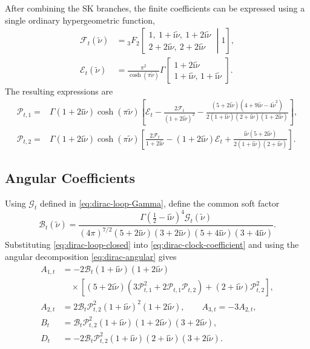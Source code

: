 \documentclass[a4paper,12pt]{article}
\def\ii{\mathrm{i}}
\def\tn{\tilde\nu}
\begin{document}
After combining the SK branches, the finite coefficients can be expressed using a single ordinary hypergeometric function,
\begin{align}
 \mathcal F_t(\tn)&={}_3F_2\!\left[
 \begin{matrix}1,\ 1+\ii\tn,\ 1+2\ii\tn\\
 2+2\ii\tn,\ 2+2\ii\tn\end{matrix}\middle|1\right],
 \nonumber\\
 \mathcal E_t(\tn)&=
 \frac{\pi^2}{\cosh(\pi\tn)}
 \Gamma\!\left[\begin{matrix}
 1+2\ii\tn\\
 1+\ii\tn,\,1+\ii\tn
 \end{matrix}\right].
 \label{eq:dirac-finite-master}
\end{align}
The resulting expressions are
\begin{align}
 \mathcal P_{t,1}={}&\Gamma(1+2\ii\tn)\cosh(\pi\tn)
 \left[\mathcal E_t-\frac{2\mathcal F_t}{(1+2\ii\tn)^2}
 -\frac{(5+2\ii\tn)(4+9\ii\tn-4\tn^2)}
 {2(1+\ii\tn)(2+\ii\tn)(1+2\ii\tn)}\right],
 \nonumber\\
 \mathcal P_{t,2}={}&\Gamma(1+2\ii\tn)\cosh(\pi\tn)
 \left[\frac{2\mathcal F_t}{1+2\ii\tn}
 -(1+2\ii\tn)\mathcal E_t
 +\frac{\ii\tn(5+2\ii\tn)}
 {2(1+\ii\tn)(2+\ii\tn)}\right].
 \label{eq:dirac-P-explicit-finite}
\end{align}

\subsection{Angular Coefficients}
\label{app:dirac-coefficients}
Using $\mathcal G_t$ defined in \eqref{eq:dirac-loop-Gamma}, define the common soft factor
\begin{equation}
 \mathcal B_{t}(\tn)=
 \frac{\Gamma(\tfrac12-\ii\tn)^4
 \mathcal G_t(\tn)}
 {(4\pi)^{7/2}(5+2\ii\tn)(3+2\ii\tn)
 (5+4\ii\tn)(3+4\ii\tn)}.
 \label{eq:dirac-common-factor}
\end{equation}
Substituting \eqref{eq:dirac-loop-closed} into \eqref{eq:dirac-clock-coefficient} and using the angular decomposition \eqref{eq:dirac-angular} gives
\begin{align}
 A_{1,t}&=-2\mathcal B_{t}(1+\ii\tn)(1+2\ii\tn)
 \nonumber\\
 &\quad\times\left[(5+2\ii\tn)(3\mathcal P_{t,1}^2
 +2\mathcal P_{t,1}\mathcal P_{t,2})
 +(2+\ii\tn)\mathcal P_{t,2}^2\right],\nonumber\\
 A_{2,t}&=2\mathcal B_{t}\mathcal P_{t,2}^2
 (1+\ii\tn)^2(1+2\ii\tn),
 \qquad A_{3,t}=-3A_{2,t},\nonumber\\
 B_{t}&=\mathcal B_{t}\mathcal P_{t,2}^2
       (1+\ii\tn)(1+2\ii\tn)(3+2\ii\tn),\nonumber\\
 D_{t}&=-2\mathcal B_{t}\mathcal P_{t,2}^2
       (1+\ii\tn)(2+\ii\tn)(3+2\ii\tn).
 \label{eq:dirac-angular-closed}
\end{align}
\end{document}
